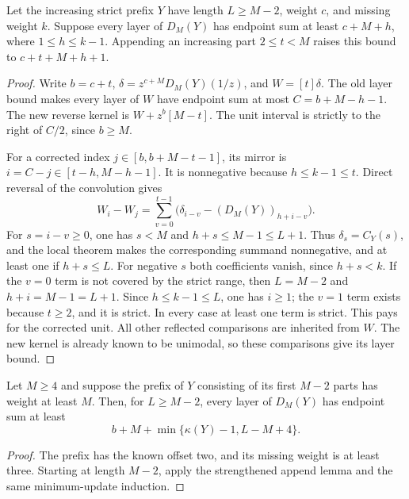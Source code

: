 \begin{lemma}
Let the increasing strict prefix $Y$ have length $L\ge M-2$,
weight $c$, and missing weight $k$. Suppose every layer of
$D_M(Y)$ has endpoint sum at least $c+M+h$, where
$1\le h\le k-1$. Appending an increasing part $2\le t<M$
raises this bound to $c+t+M+h+1$.
\end{lemma}
\begin{proof}
Write $b=c+t$, $\delta=z^{c+M}D_M(Y)(1/z)$, and $W=[t]\delta$.
The old layer bound makes every layer of $W$ have endpoint sum
at most $C=b+M-h-1$. The new reverse kernel is
$W+z^b[M-t]$. The unit interval is strictly to the right of
$C/2$, since $b\ge M$.

For a corrected index $j\in[b,b+M-t-1]$, its mirror is
$i=C-j\in[t-h,M-h-1]$. It is nonnegative because
$h\le k-1\le t$. Direct reversal of the convolution gives
\[
 W_i-W_j=\sum_{v=0}^{t-1}
    \bigl(\delta_{i-v}-(D_M(Y))_{h+i-v}\bigr).
\]
For $s=i-v\ge0$, one has $s<M$ and $h+s\le M-1\le L+1$.
Thus $\delta_s=C_Y(s)$, and the local theorem makes the
corresponding summand nonnegative, and at least one if $h+s\le L$.
For negative $s$ both coefficients vanish, since $h+s<k$.
If the $v=0$ term is not covered by the strict range, then
$L=M-2$ and $h+i=M-1=L+1$. Since $h\le k-1\le L$,
one has $i\ge1$; the $v=1$ term exists because $t\ge2$,
and it is strict. In every case at least one term is strict.
This pays for the corrected unit. All other reflected
comparisons are inherited from $W$. The new kernel is already
known to be unimodal, so these comparisons give its layer bound.
\end{proof}

\begin{corollary}
Let $M\ge4$ and suppose the prefix of $Y$ consisting of its first
$M-2$ parts has weight at least $M$. Then, for $L\ge M-2$,
every layer of $D_M(Y)$ has endpoint sum at least
\[
 b+M+\min\{\kappa(Y)-1,L-M+4\}.
\]
\end{corollary}
\begin{proof}
The prefix has the known offset two, and its missing weight is
at least three. Starting at length $M-2$, apply the strengthened
append lemma and the same minimum-update induction.
\end{proof}

